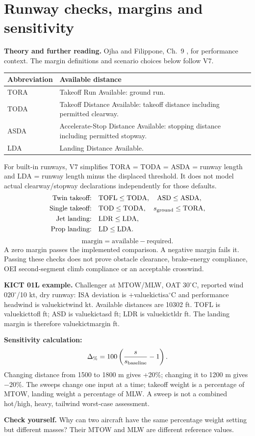 \documentclass[11pt,letterpaper]{article}
\newcommand{\val}[1]{\csname value#1\endcsname}
\newcommand{\topic}[1]{\clearpage\section{#1}}
\newcommand{\reading}[1]{{\small\color{navy}\textbf{Theory and further reading.} #1\par}\vspace{3pt}}
\newcommand{\selfcheck}[1]{\par\textbf{Check yourself.} #1\par}
\begin{document}
\topic{Runway checks, margins and sensitivity}
\reading{Ojha \cite{ojha} and Filippone, Ch.~9 \cite{filippone}, for performance context. The margin definitions and scenario choices below follow V7.}
\par
\begin{tabularx}{\linewidth}{@{}lX@{}}\toprule
Abbreviation & Available distance\\\midrule
TORA & Takeoff Run Available: ground run.\\
TODA & Takeoff Distance Available: takeoff distance including permitted clearway.\\
ASDA & Accelerate-Stop Distance Available: stopping distance including permitted stopway.\\
LDA & Landing Distance Available.\\\bottomrule
\end{tabularx}
For built-in runways, V7 simplifies TORA = TODA = ASDA = runway length and
LDA = runway length minus the displaced threshold. It does not model actual
clearway/stopway declarations independently for those defaults.
\begin{align*}
\text{Twin takeoff:}&\quad\mathrm{TOFL}\le\mathrm{TODA},\quad\mathrm{ASD}\le\mathrm{ASDA},\\
\text{Single takeoff:}&\quad\mathrm{TOD}\le\mathrm{TODA},\quad s_{\rm ground}\le\mathrm{TORA},\\
\text{Jet landing:}&\quad\mathrm{LDR}\le\mathrm{LDA},\\
\text{Prop landing:}&\quad\mathrm{LD}\le\mathrm{LDA}.
\end{align*}
\[
\mathrm{margin}=\mathrm{available}-\mathrm{required}.
\]
A zero margin passes the implemented comparison. A negative margin fails it.
Passing these checks does not prove obstacle clearance, brake-energy compliance,
OEI second-segment climb compliance or an acceptable crosswind.

\textbf{KICT 01L example.} Challenger at MTOW/MLW, OAT $30^\circ$C, reported
wind $020^\circ$/10 kt, dry runway: ISA deviation is +\val{kictisa}$^\circ$C and
performance headwind is \val{kictwind} kt. Available distances are 10302 ft.
TOFL is \val{kicttofl} ft; ASD is \val{kictasd} ft; LDR is \val{kictldr} ft.
The landing margin is therefore \val{kictmargin} ft.

\textbf{Sensitivity calculation:}
\[
\Delta_{\%}=100\left(\frac{s}{s_{\rm baseline}}-1\right).
\]
Changing distance from 1500 to 1800 m gives +20\%; changing it to 1200 m gives
$-20\%$. The sweeps change one input at a time; takeoff weight is a percentage
of MTOW, landing weight a percentage of MLW. A sweep is not a combined hot/high,
heavy, tailwind worst-case assessment.
\selfcheck{Why can two aircraft have the same percentage weight setting but different
masses? Their MTOW and MLW are different reference values.}
\end{document}
